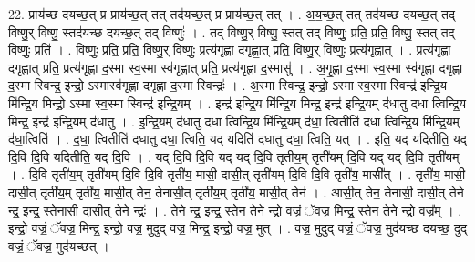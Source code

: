 \documentclass[17pt]{extarticle}
\begin{document}
22. प्राय॑च्छ दयच्छ॒त् प्र प्राय॑च्छ॒त् तत् तद॑यच्छ॒त् प्र प्राय॑च्छ॒त् तत् । . अ॒य॒च्छ॒त् तत् तद॑यच्छ दयच्छ॒त् तद् विष्णु॒र् विष्णु॒ स्तद॑यच्छ दयच्छ॒त् तद् विष्णुः॑ । . तद् विष्णु॒र् विष्णु॒ स्तत् तद् विष्णुः॒ प्रति॒ प्रति॒ विष्णु॒ स्तत् तद् विष्णुः॒ प्रति॑ । . विष्णुः॒ प्रति॒ प्रति॒ विष्णु॒र् विष्णुः॒ प्रत्य॑गृह्णा दगृह्णा॒त् प्रति॒ विष्णु॒र् विष्णुः॒ प्रत्य॑गृह्णात् । . प्रत्य॑गृह्णा दगृह्णा॒त् प्रति॒ प्रत्य॑गृह्णा द॒स्मा स्व॒स्मा स्व॑गृह्णा॒त् प्रति॒ प्रत्य॑गृह्णा द॒स्मासु॑ । . अ॒गृ॒ह्णा॒ द॒स्मा स्व॒स्मा स्व॑गृह्णा दगृह्णा द॒स्मा स्विन्द्र॒ इन्द्रो॒ ऽस्मास्व॑गृह्णा दगृह्णा द॒स्मा स्विन्द्रः॑ । . अ॒स्मा स्विन्द्र॒ इन्द्रो॒ ऽस्मा स्व॒स्मा स्विन्द्र॑ इन्द्रि॒य मि॑न्द्रि॒य मिन्द्रो॒ ऽस्मा स्व॒स्मा स्विन्द्र॑ इन्द्रि॒यम् । . इन्द्र॑ इन्द्रि॒य मि॑न्द्रि॒य मिन्द्र॒ इन्द्र॑ इन्द्रि॒यम् द॑धातु दधा त्विन्द्रि॒य मिन्द्र॒ इन्द्र॑ इन्द्रि॒यम् द॑धातु । . इ॒न्द्रि॒यम् द॑धातु दधा त्विन्द्रि॒य मि॑न्द्रि॒यम् द॑धा॒ त्वितीति॑ दधा त्विन्द्रि॒य मि॑न्द्रि॒यम् द॑धा॒त्विति॑ । . द॒धा॒ त्वितीति॑ दधातु दधा॒ त्विति॒ यद् यदिति॑ दधातु दधा॒ त्विति॒ यत् । . इति॒ यद् यदितीति॒ यद् दि॒वि दि॒वि यदितीति॒ यद् दि॒वि । . यद् दि॒वि दि॒वि यद् यद् दि॒वि तृती॑य॒म् तृती॑यम् दि॒वि यद् यद् दि॒वि तृती॑यम् । . दि॒वि तृती॑य॒म् तृती॑यम् दि॒वि दि॒वि तृती॑य॒ मासी॒ दासी॒त् तृती॑यम् दि॒वि दि॒वि तृती॑य॒ मासी᳚त् । . तृती॑य॒ मासी॒ दासी॒त् तृती॑य॒म् तृती॑य॒ मासी॒त् तेन॒ तेनासी॒त् तृती॑य॒म् तृती॑य॒ मासी॒त् तेन॑ । . आसी॒त् तेन॒ तेनासी॒ दासी॒त् तेने न्द्र॒ इन्द्र॒ स्तेनासी॒ दासी॒त् तेने न्द्रः॑ । . तेने न्द्र॒ इन्द्र॒ स्तेन॒ तेने न्द्रो॒ वज्रं॒ ॅवज्र॒ मिन्द्र॒ स्तेन॒ तेने न्द्रो॒ वज्र᳚म् । . इन्द्रो॒ वज्रं॒ ॅवज्र॒ मिन्द्र॒ इन्द्रो॒ वज्र॒ मुदुद् वज्र॒ मिन्द्र॒ इन्द्रो॒ वज्र॒ मुत् । . वज्र॒ मुदुद् वज्रं॒ ॅवज्र॒ मुद॑यच्छ दयच्छ॒ दुद् वज्रं॒ ॅवज्र॒ मुद॑यच्छत् । \newline
\end{document}
